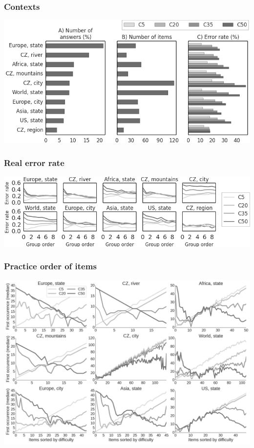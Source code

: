 \documentclass[bigger]{beamer}
\begin{document}
\begin{frame}
  \frametitle{Contexts}
  \includegraphics[width=\textwidth]{img/stats_by_context_ab}
\end{frame}


\begin{frame}
  \frametitle{Real error rate}
  \includegraphics[width=\textwidth]{img/error_rate_by_set_order_by_context}
\end{frame}

\begin{frame}
  \frametitle{Practice order of items}
  \includegraphics[width=\textwidth]{img/target_difficulty_item_occurences_order}
\end{frame}
\end{document}
